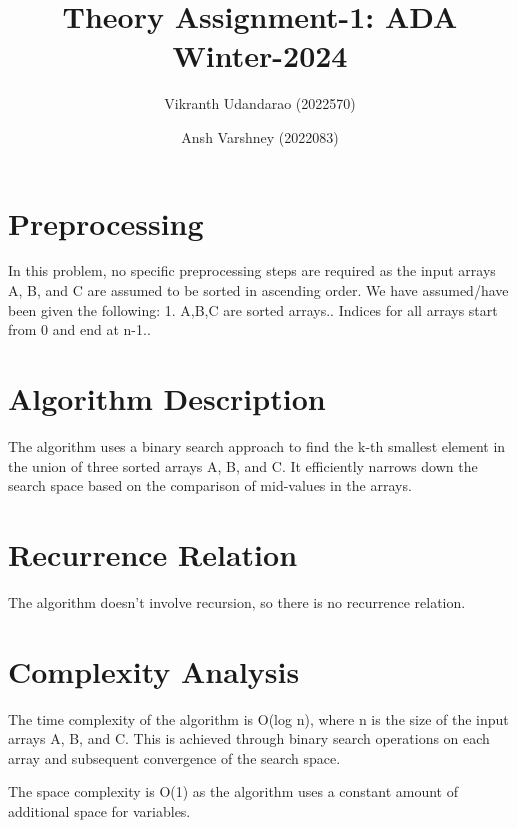 \documentclass{article}
\title{Theory Assignment-1: ADA Winter-2024}
\author{Vikranth Udandarao (2022570) \and Ansh Varshney (2022083)}
\date{}
\begin{document}
\maketitle

\section{Preprocessing}
In this problem, no specific preprocessing steps are required as the input arrays A, B, and C are assumed to be sorted in ascending order. We have assumed/have been given the following: 1. A,B,C are sorted arrays.\2. Indices for all arrays start from 0 and end at n-1.\3.

\section{Algorithm Description}
The algorithm uses a binary search approach to find the k-th smallest element in the union of three sorted arrays A, B, and C. It efficiently narrows down the search space based on the comparison of mid-values in the arrays.

\section{Recurrence Relation}
The algorithm doesn't involve recursion, so there is no recurrence relation.

\section{Complexity Analysis}
The time complexity of the algorithm is O(log n), where n is the size of the input arrays A, B, and C. This is achieved through binary search operations on each array and subsequent convergence of the search space.

The space complexity is O(1) as the algorithm uses a constant amount of additional space for variables.
\end{document}

